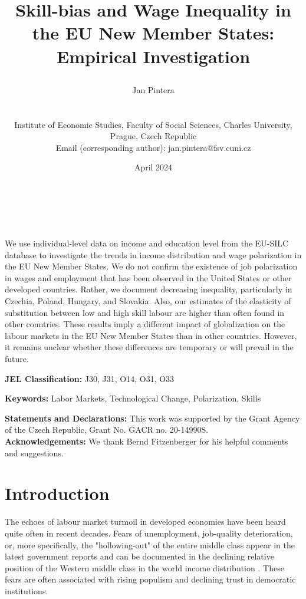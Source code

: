 \documentclass[11pt]{article}
\title{\begin{LARGE}Skill-bias and Wage Inequality in the EU New Member States: Empirical Investigation\end{LARGE}}
\author{    
    \begin{large}Jan Pintera\end{large} \\\vspace{5mm} \begin{small} Institute of Economic Studies, Faculty of Social Sciences, Charles University,\\ Prague, Czech Republic\\
    Email (corresponding author): jan.pintera@fsv.cuni.cz \end{small}
}
\date{April 2024}
\makeatletter
\renewcommand{\maketitle}{\bgroup\setlength{\parindent}{0pt}
\begin{flushright}
  \textbf{\@title}\\
  \vspace{5mm}
  \@author\\
  \vspace{5mm}
  \@date
\end{flushright}\egroup
}
\renewenvironment{abstract}
 {\small
  \begin{flushleft}
  \bfseries \abstractname\vspace{-.5em}\vspace{0pt}
  \end{flushleft}
  \list{}{%
    \setlength{\leftmargin}{0mm}%
    \setlength{\rightmargin}{\leftmargin}%
  }%
  \item\relax}
 {\endlist}
\def \jel {	J30, J31, O14, O31, O33}
\def \Keywords {Labor Markets, Technological Change, Polarization, Skills}
\makeatother
\begin{document}
\maketitle

\thispagestyle{empty}
\begin{abstract}
We use individual-level data on income and education level from the EU-SILC database to investigate the trends in income distribution and wage polarization in the EU New Member States. We do not confirm the existence of job polarization in wages and employment that has been observed in the United States or other developed countries. Rather, we document decreasing inequality, particularly in Czechia, Poland, Hungary, and Slovakia. Also, our estimates of the elasticity of substitution between low and 
high skill labour are higher than often found in other countries. These results imply a different impact of globalization on the labour markets in the EU New Member States than in other countries. However, it remains unclear whether these differences are temporary or will prevail in the future.
\bigskip

\textbf{JEL Classification:} \jel

\textbf{Keywords:}  \Keywords

\bigskip
\textbf{Statements and Declarations:}
This work was supported by the Grant Agency of the Czech Republic, Grant No. GACR no. 20-14990S.
\\

\textbf{Acknowledgements:}
We thank Bernd Fitzenberger for his helpful comments and suggestions.

\end{abstract}
\clearpage
\setcounter{page}{1}



\section{Introduction}
The echoes of labour market turmoil in developed economies have been heard quite often in recent decades. Fears of unemployment, job-quality deterioration, or, more specifically, the "hollowing-out" of the entire middle class appear in the latest government reports \citetext{e.g., \citealt{rodrik2020economic}} and can be documented in the declining relative position of the Western middle class in the world income distribution \citep{milanovic2020elephant}. These fears are often associated with rising populism and declining trust in democratic institutions.
\end{document}
